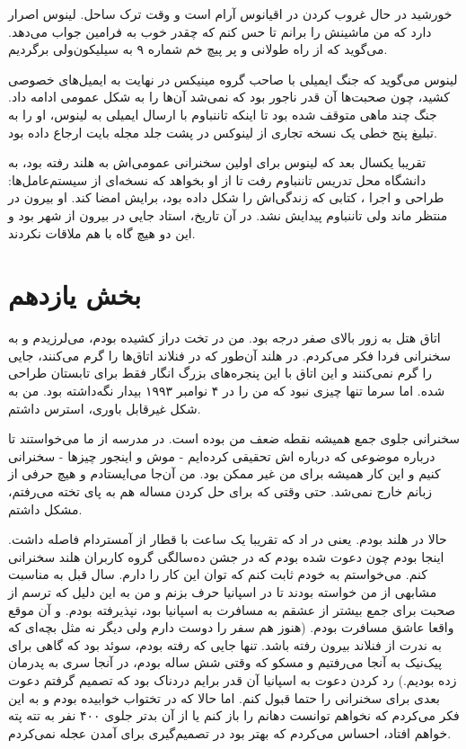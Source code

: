 \begin{journal}
خورشید در حال غروب کردن در اقیانوس آرام است و وقت ترک ساحل. لینوس
اصرار دارد که من ماشینش را برانم تا حس کنم که چقدر خوب به فرامین جواب
می‌دهد. می‌گوید که از راه طولانی و پر پیچ خم شماره ۹ به سیلیکون‌ولی
برگردیم.

لینوس می‌گوید که جنگ ایمیلی با صاحب گروه مینیکس در نهایت به ایمیل‌های
خصوصی کشید، چون صحبت‌ها آن قدر ناجور بود که نمی‌شد آن‌ها را به شکل عمومی
ادامه داد. جنگ چند ماهی متوقف شده بود تا اینکه تاننباوم با ارسال
ایمیلی به لینوس، او را به تبلیغ پنج خطی یک نسخه تجاری از لینوکس در پشت
جلد مجله بایت ارجاع داده بود.


تقریبا یکسال بعد که لینوس برای اولین سخنرانی عمومی‌اش به هلند رفته بود،
به دانشگاه محل تدریس تاننباوم رفت تا از او بخواهد که نسخه‌ای از
سیستم‌عامل‌ها: طراحی و اجرا ، کتابی که زندگی‌اش را شکل داده بود، برایش
امضا کند. او بیرون در منتظر ماند ولی تاننباوم پیدایش نشد. در آن تاریخ،
استاد جایی در بیرون از شهر بود و این دو هیچ گاه با هم ملاقات نکردند.
\end{journal}

\section{بخش یازدهم}
اتاق هتل به زور بالای صفر درجه بود. من در تخت دراز کشیده بودم،
می‌لرزیدم و به سخنرانی فردا فکر می‌کردم. در هلند آن‌طور که در فنلاند
اتاق‌ها را گرم می‌کنند، جایی را گرم نمی‌کنند و این اتاق با این پنجره‌های
بزرگ انگار فقط برای تابستان طراحی شده. اما سرما تنها چیزی نبود که من
را در ۴ نوامبر ۱۹۹۳ بیدار نگه‌داشته بود. من به شکل غیرقابل باوری، استرس
داشتم.

سخنرانی جلوی جمع همیشه نقطه ضعف من بوده است. در مدرسه از ما می‌خواستند
تا درباره موضوعی که درباره اش تحقیقی کرده‌ایم - موش و اینجور چیزها -
سخنرانی کنیم و این کار همیشه برای من غیر ممکن بود. من آن‌جا می‌ایستادم و
هیچ حرفی از زبانم خارج نمی‌شد. حتی وقتی که برای حل کردن مساله هم به پای
تخته می‌رفتم، مشکل داشتم.

حالا در هلند بودم. یعنی در اد که تقریبا یک ساعت با قطار از
آمستردام فاصله داشت. اینجا بودم چون دعوت شده بودم که در جشن ده‌سالگی
گروه کاربران هلند سخنرانی کنم. می‌خواستم به خودم ثابت کنم که توان این
کار را دارم. سال قبل به مناسبت مشابهی از من خواسته بودند تا در اسپانیا
حرف بزنم و من به این دلیل که ترسم از صحبت برای جمع بیشتر از عشقم به
مسافرت به اسپانیا بود، نپذیرفته بودم. و آن موقع واقعا عاشق مسافرت
بودم. (هنوز هم سفر را دوست دارم ولی دیگر نه مثل بچه‌‌ای که به ندرت از
فنلاند بیرون رفته باشد. تنها جایی که رفته بودم، سوئد بود که گاهی برای
پیک‌نیک به آنجا می‌رفتیم و مسکو که وقتی شش ساله بودم، در آنجا سری به
پدرمان زده بودیم.) رد کردن دعوت به اسپانیا آن قدر برایم دردناک بود که
تصمیم گرفتم دعوت بعدی برای سخنرانی را حتما قبول کنم. اما حالا که در
تختواب خوابیده بودم و به این فکر می‌کردم که نخواهم توانست دهانم را باز
کنم یا از آن بدتر جلوی ۴۰۰ نفر به تته پته خواهم افتاد، احساس می‌کردم که
بهتر بود در تصمیم‌گیری برای آمدن عجله نمی‌کردم.

